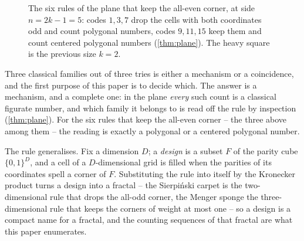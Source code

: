 \documentclass[11pt]{amsart}
\theoremstyle{definition}
\theoremstyle{remark}
\begin{document}
\begin{figure}[!ht]
\caption{The six rules of the plane that keep the all-even corner, at side $n = 2k-1 = 5$: codes $1, 3, 7$ drop the cells with both coordinates odd and count polygonal numbers, codes $9, 11, 15$ keep them and count centered polygonal numbers (\cref{thm:plane}). The heavy square is the previous size $k = 2$.}
\label{fig:families}
\end{figure}

Three classical families out of three tries is either a mechanism or a coincidence, and the first purpose of this paper is to decide which. The answer is a mechanism, and a complete one: in the plane \emph{every} such count is a classical figurate number, and which family it belongs to is read off the rule by inspection (\cref{thm:plane}). For the six rules that keep the all-even corner -- the three above among them -- the reading is exactly a polygonal or a centered polygonal number.

The rule generalises. Fix a dimension $D$; a \emph{design} is a subset $F$ of the parity cube $\{0,1\}^{D}$, and a cell of a $D$-dimensional grid is filled when the parities of its coordinates spell a corner of $F$. Substituting the rule into itself by the Kronecker product turns a design into a fractal -- the Sierpi\'nski carpet is the two-dimensional rule that drops the all-odd corner, the Menger sponge the three-dimensional rule that keeps the corners of weight at most one -- so a design is a compact name for a fractal, and the counting sequences of that fractal are what this paper enumerates.
\end{document}

